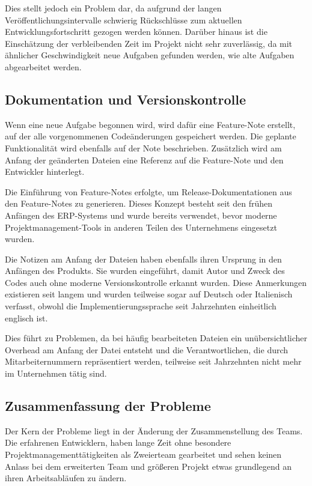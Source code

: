Dies stellt jedoch ein Problem dar, da aufgrund der langen Veröffentlichungsintervalle schwierig Rückschlüsse zum aktuellen Entwicklungsfortschritt gezogen werden können.
Darüber hinaus ist die Einschätzung der verbleibenden Zeit im Projekt nicht sehr zuverlässig, da mit ähnlicher Geschwindigkeit neue Aufgaben gefunden werden, wie alte Aufgaben abgearbeitet werden.

\subsection{Dokumentation und Versionskontrolle}

Wenn eine neue Aufgabe begonnen wird, wird dafür eine Feature-Note erstellt, auf der alle vorgenommenen Codeänderungen gespeichert werden.
Die geplante Funktionalität wird ebenfalls auf der Note beschrieben. Zusätzlich wird am Anfang der geänderten Dateien eine Referenz auf die Feature-Note und den Entwickler hinterlegt.

Die Einführung von Feature-Notes erfolgte, um Release-Dokumentationen aus den Feature-Notes zu generieren. Dieses Konzept besteht seit den frühen Anfängen des ERP-Systems und wurde bereits verwendet, bevor moderne Projektmanagement-Tools in anderen Teilen des Unternehmens eingesetzt wurden.
 
Die Notizen am Anfang der Dateien haben ebenfalls ihren Ursprung in den Anfängen des Produkts. Sie wurden eingeführt, damit Autor und Zweck des Codes auch ohne moderne Versionskontrolle erkannt wurden.
Diese Anmerkungen existieren seit langem und wurden teilweise sogar auf Deutsch oder Italienisch verfasst, obwohl die Implementierungssprache seit Jahrzehnten einheitlich englisch ist.

Dies führt zu Problemen, da bei häufig bearbeiteten Dateien ein unübersichtlicher Overhead am Anfang der Datei entsteht und die Verantwortlichen, die durch Mitarbeiternummern repräsentiert werden, teilweise seit Jahrzehnten nicht mehr im Unternehmen tätig sind.

\subsection{Zusammenfassung der Probleme}

Der Kern der Probleme liegt in der Änderung der Zusammenstellung des Teams.
Die erfahrenen Entwicklern, haben lange Zeit ohne besondere Projektmanagementtätigkeiten als Zweierteam gearbeitet und sehen keinen Anlass bei dem erweiterten Team und größeren Projekt etwas grundlegend an ihren Arbeitsabläufen zu ändern.


